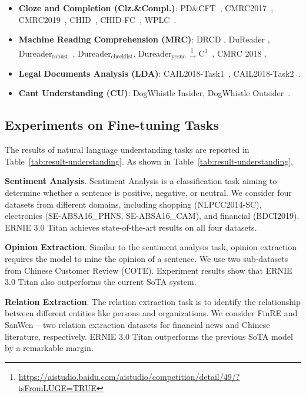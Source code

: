 \begin{itemize}
\item \textbf{Cloze and Completion (Clz.\&Compl.)}: PD\&CFT~\cite{cui2016pdcft}, CMRC2017~\cite{cui2017dataset}, CMRC2019~\cite{cui2020sentence}, CHID~\cite{zheng2019chid}, CHID-FC~\cite{xu2021fewclue}, WPLC~\cite{ge2021chinese}.
\item \textbf{Machine Reading Comprehension (MRC)}: DRCD \cite{shao2018drcd}, DuReader \cite{he2017dureader}, Dureader$_\text{robust}$~\cite{tang2020dureaderrobust}, Dureader$_\text{checklist}$,   Dureader$_\text{yesno}$~\footnote{\url{https://aistudio.baidu.com/aistudio/competition/detail/49/?isFromLUGE=TRUE}}, C$^3$~\cite{sun2020c3}, CMRC 2018 \cite{DBLP:journals/corr/abs-1810-07366}.
\item \textbf{Legal Documents Analysis (LDA)}: CAIL2018-Task1~\cite{xiao2018cail2018}, CAIL2018-Task2~\cite{xiao2018cail2018}.
\item \textbf{Cant Understanding (CU)}: DogWhistle Insider, DogWhistle Outsider~\cite{xu-etal-2021-blow}.
\end{itemize}

\subsection{Experiments on Fine-tuning Tasks}\label{sec:fine-tasks}
The results of natural language understanding tasks are reported in Table~\ref{tab:result-understanding}. As shown in Table~\ref{tab:result-understanding}, 

\textbf{Sentiment Analysis}. Sentiment Analysis is a classification task aiming to determine whether a sentence is positive, negative, or neutral. We consider four datasets from different domains, including shopping (NLPCC2014-SC), electronics (SE-ABSA16\_PHNS, SE-ABSA16\_CAM), and financial (BDCI2019). ERNIE 3.0 Titan achieves state-of-the-art results on all four datasets.

\textbf{Opinion Extraction}. Similar to the sentiment analysis task, opinion extraction requires the model to mine the opinion of a sentence. We use two sub-datasets from Chinese Customer Review (COTE). Experiment results show that ERNIE 3.0 Titan also outperforms the current SoTA system.

\textbf{Relation Extraction}. The relation extraction task is to identify the relationship between different entities like persons and organizations. We consider FinRE and SanWen -- two relation extraction datasets for financial news and Chinese literature, respectively. ERNIE 3.0 Titan outperforms the previous SoTA model by a remarkable margin.


